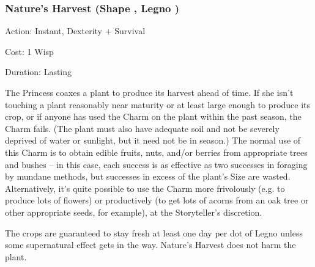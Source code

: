 \subsubsection*{Nature's Harvest (Shape \textbullet, Legno \textbullet)}

\noindent Action: Instant, Dexterity + Survival 

\noindent Cost: 1 Wisp

\noindent Duration: Lasting 

The Princess coaxes a plant to produce its harvest ahead of time. If she isn't touching a plant reasonably near maturity or at least large enough to produce its crop, or if anyone has used the Charm on the plant within the past season, the Charm fails. (The plant must also have adequate soil and not be severely deprived of water or sunlight, but it need not be in season.) The normal use of this Charm is to obtain edible fruits, nuts, and/or berries from appropriate trees and bushes -- in this case, each success is as effective as two successes in foraging by mundane methods, but successes in excess of the plant's Size are wasted. Alternatively, it's quite possible to use the Charm more frivolously (e.g. to produce lots of flowers) or productively (to get lots of acorns from an oak tree or other appropriate seeds, for example), at the Storyteller's discretion.

The crops are guaranteed to stay fresh at least one day per dot of Legno unless some supernatural effect gets in the way. Nature's Harvest does not harm the plant. 

